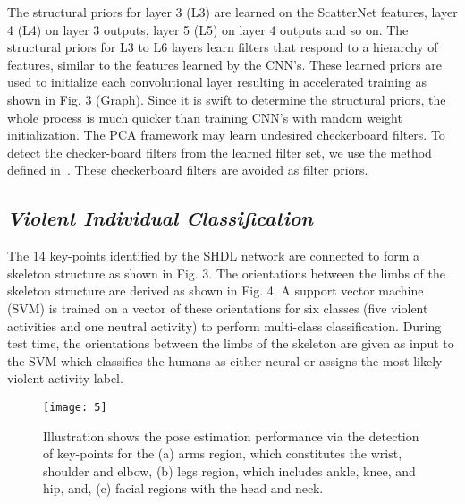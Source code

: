 \documentclass[10pt,twocolumn,letterpaper]{article}
\begin{document}
The structural priors for layer 3 (L3) are learned on the ScatterNet features, layer 4 (L4) on layer 3 outputs, layer 5 (L5) on layer 4 outputs and so on. The structural priors for L3 to L6 layers learn filters that respond to a hierarchy of features, similar to the features learned by the CNN's. These learned priors are used to initialize each convolutional layer resulting in accelerated training as shown in Fig. 3 (Graph). Since it is swift to determine the structural priors, the whole process is much quicker than training CNN's with random weight initialization. The PCA framework may learn undesired checkerboard filters. To detect the checker-board filters from the learned filter set, we use the method defined in~\cite{geiger2012}. These checkerboard filters are avoided as filter priors. 

\subsection{\textbf{\textit{Violent Individual Classification}}}
The 14 key-points identified by the SHDL network are connected to form a skeleton structure as shown in Fig. 3. The orientations between the limbs of the skeleton structure are derived as shown in Fig. 4.  A support vector machine (SVM) is trained on a vector of these orientations for six classes (five violent activities and one neutral activity) to perform multi-class classification. During test time, the orientations between the limbs of the skeleton are given as input to the SVM which classifies the humans as either neural or assigns the most likely violent activity label.

	
		
		

\begin{figure*}
	\begin{center}
		\texttt{[image: 5]}
	\end{center}
	\caption{
		Illustration shows the pose estimation performance via the detection of key-points for the (a) arms region, which constitutes the wrist, shoulder and elbow, (b) legs region, which includes ankle, knee, and hip, and, (c) facial regions with the head and neck.}
	\label{fig:short}
\end{figure*}
\end{document}
